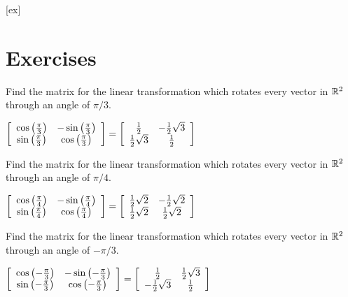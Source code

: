 [ex]
\section*{Exercises}

\begin{enumialphparenastyle}

\begin{ex}  Find the matrix for the linear transformation which
rotates every vector in $\mathbb{R}^{2}$ through an angle of $\pi /3.$
\begin{sol}
$\leftB
\begin{array}{cc}
\cos \left(
\frac{\pi }{3}\right) & -\sin \left( \frac{\pi }{3}\right) \\
\sin \left( \frac{\pi }{3}\right) & \cos \left( \frac{\pi }{3}\right)%
\end{array}
\rightB = \leftB
\begin{array}{cc}
\frac{1}{2} & -\frac{1}{2}\sqrt{3} \\
\frac{1}{2}\sqrt{3} & \frac{1}{2}
\end{array}
\rightB $
\end{sol}
\end{ex}


\begin{ex} Find the matrix for the linear transformation which rotates every
vector in $\mathbb{R}^{2}$ through an angle of $\pi /4.$
\begin{sol}
$\left[
\begin{array}{cc}
\cos \left( \frac{\pi }{4}\right) & -\sin \left( \frac{\pi }{4}\right) \\
\sin \left( \frac{\pi }{4}\right) & \cos \left( \frac{\pi }{4}\right)
\end{array}
\right] = \left[
\begin{array}{cc}
\frac{1}{2}\sqrt{2} & -\frac{1}{2}\sqrt{2} \\
\frac{1}{2}\sqrt{2} & \frac{1}{2}\sqrt{2}
\end{array}
\right] $
\end{sol}
\end{ex}

\begin{ex} Find the matrix for the linear transformation which rotates every
vector in $\mathbb{R}^{2}$ through an angle of $-\pi /3.$
\begin{sol}
$\left[
\begin{array}{cc}
\cos \left( -\frac{\pi }{3}\right) & -\sin \left( -\frac{\pi }{3}\right) \\
\sin \left( -\frac{\pi }{3}\right) & \cos \left( -\frac{\pi }{3}\right)
\end{array}
\right] = \left[
\begin{array}{cc}
\frac{1}{2} & \frac{1}{2}\sqrt{3} \\
-\frac{1}{2}\sqrt{3} & \frac{1}{2}
\end{array}
\right] $
\end{sol}
\end{ex}


\end{enumialphparenastyle}
